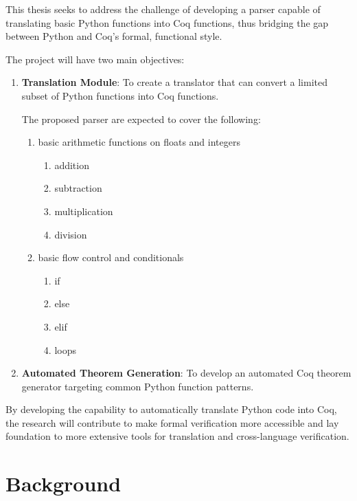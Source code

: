 \documentclass[11pt,A4]{article}
\newcommand{\blue}[1]{\textcolor{RoyalBlue}{#1}}
\newcommand{\instructions}[1]{\blue{\textit{#1}}}
\renewcommand{\instructions}[1]{}
\begin{document}
This thesis seeks to address the challenge of developing a parser capable of translating basic Python functions into Coq functions, thus bridging the gap between Python and Coq's formal, functional style. \par

The project will have two main objectives:
\begin{enumerate}
    \item \textbf{Translation Module}: To create a translator that can convert a limited subset of Python functions into Coq functions. \par
    The proposed parser are expected to cover the following:
    \begin{enumerate}
        \item basic arithmetic functions on floats and integers
        \begin{enumerate}
            \item addition 
            \item subtraction
            \item multiplication
            \item division
        \end{enumerate}
        \item basic flow control and conditionals
        \begin{enumerate}
            \item if
            \item else
            \item elif
            \item loops
        \end{enumerate}
    \end{enumerate}
    \item \textbf{Automated Theorem Generation}: To develop an automated Coq theorem generator targeting common Python function patterns. 
\end{enumerate}
By developing the capability to automatically translate Python code into Coq, the research will contribute to make formal verification more accessible and lay foundation to more extensive tools for translation and cross-language verification. 
\section*{Background}
\instructions{What prior work has there been on or related to your task? Please
  provide bibliographic references where available}
\end{document}
